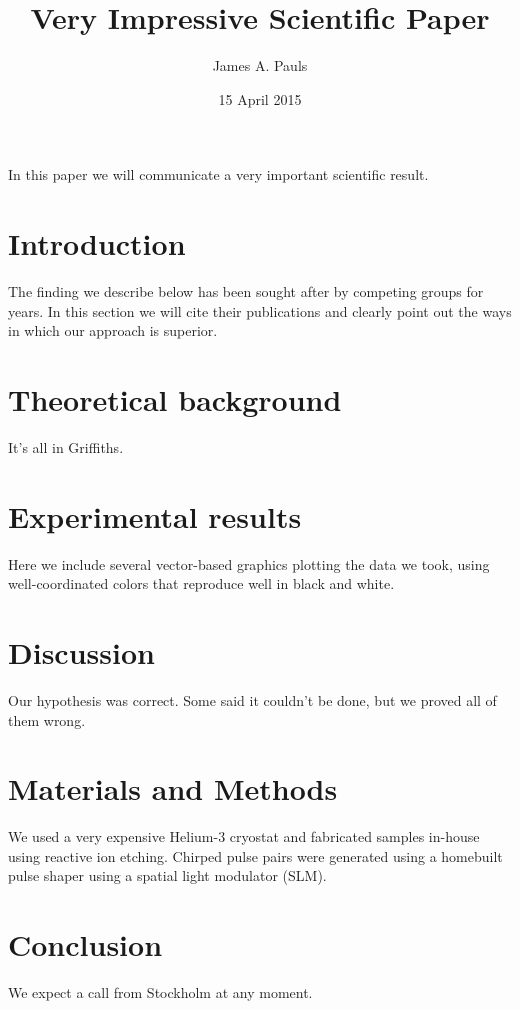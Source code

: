 \documentclass[11pt]{amsart}
\title{Very Impressive Scientific Paper}
\author{James A. Pauls}
\date{15 April 2015}
\begin{document}

In this paper we will communicate a very important scientific result.

\section{Introduction}

The finding we describe below has been sought after by competing groups
for years. In this section we will cite their publications and clearly
point out the ways in which our approach is superior.

\section{Theoretical background}

It's all in Griffiths.

\section{Experimental results}

Here we include several vector-based graphics plotting the data we
took, using well-coordinated colors that reproduce well in black and
white.

\section{Discussion}

Our hypothesis was correct. Some said it couldn't be done, but we
proved all of them wrong.

\section{Materials and Methods}

We used a very expensive Helium-3 cryostat and fabricated samples
in-house using reactive ion etching. Chirped pulse pairs were
generated using a homebuilt pulse shaper using a spatial light
modulator (SLM).

\section{Conclusion}

We expect a call from Stockholm at any moment.
\end{document}
